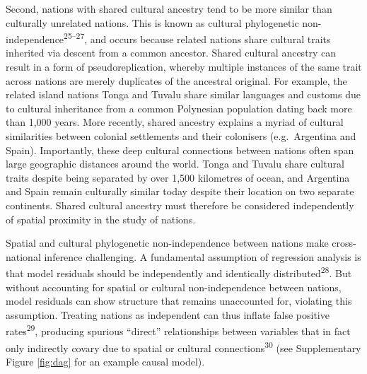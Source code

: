 \documentclass[
  man,floatsintext]{apa6}
\begin{document}
Second, nations with shared cultural ancestry tend to be more similar than culturally unrelated nations. This is known as cultural phylogenetic non-independence\textsuperscript{25--27}, and occurs because related nations share cultural traits inherited via descent from a common ancestor. Shared cultural ancestry can result in a form of pseudoreplication, whereby multiple instances of the same trait across nations are merely duplicates of the ancestral original. For example, the related island nations Tonga and Tuvalu share similar languages and customs due to cultural inheritance from a common Polynesian population dating back more than 1,000 years. More recently, shared ancestry explains a myriad of cultural similarities between colonial settlements and their colonisers (e.g.~Argentina and Spain). Importantly, these deep cultural connections between nations often span large geographic distances around the world. Tonga and Tuvalu share cultural traits despite being separated by over 1,500 kilometres of ocean, and Argentina and Spain remain culturally similar today despite their location on two separate continents. Shared cultural ancestry must therefore be considered independently of spatial proximity in the study of nations.

Spatial and cultural phylogenetic non-independence between nations make cross-national inference challenging. A fundamental assumption of regression analysis is that model residuals should be independently and identically distributed\textsuperscript{28}. But without accounting for spatial or cultural non-independence between nations, model residuals can show structure that remains unaccounted for, violating this assumption. Treating nations as independent can thus inflate false positive rates\textsuperscript{29}, producing spurious ``direct'' relationships between variables that in fact only indirectly covary due to spatial or cultural connections\textsuperscript{30} (see Supplementary Figure \ref{fig:dag} for an example causal model).
\end{document}
